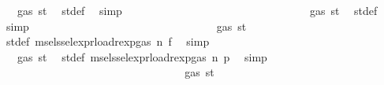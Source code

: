 \begin{isabellebody}
\ {\isachardoublequoteopen}{\isasymdots}\ {\isasymle}\ gas\ st{\isacharprime}{\kern0pt}{\isacharprime}{\kern0pt}{\isacharprime}{\kern0pt}{\isacharprime}{\kern0pt}{\isachardoublequoteclose}\ \isamarkupfalse%
\ st{\isacharprime}{\kern0pt}{\isacharprime}{\kern0pt}{\isacharprime}{\kern0pt}{\isacharprime}{\kern0pt}{\isacharprime}{\kern0pt}{\isacharunderscore}{\kern0pt}def\ \isamarkupfalse%
\ simp\isanewline
\ \ \ \ \ \ \ \ \ \ \ \ \ \ \ \ \ \ \ \ \ \ \ \ \ \ \ \ \isamarkupfalse%
\ \isamarkupfalse%
\ {\isachardoublequoteopen}{\isasymdots}\ {\isasymle}\ gas\ st{\isacharprime}{\kern0pt}{\isacharprime}{\kern0pt}{\isacharprime}{\kern0pt}{\isachardoublequoteclose}\ \isamarkupfalse%
\ st{\isacharprime}{\kern0pt}{\isacharprime}{\kern0pt}{\isacharprime}{\kern0pt}{\isacharprime}{\kern0pt}{\isacharunderscore}{\kern0pt}def\ \isamarkupfalse%
\ simp\isanewline
\ \ \ \ \ \ \ \ \ \ \ \ \ \ \ \ \ \ \ \ \ \ \ \ \ \ \ \ \isamarkupfalse%
\ \isamarkupfalse%
\ {\isachardoublequoteopen}{\isasymdots}\ {\isasymle}\ gas\ st{\isacharprime}{\kern0pt}{\isacharprime}{\kern0pt}{\isachardoublequoteclose}\ \isamarkupfalse%
\ st{\isacharprime}{\kern0pt}{\isacharprime}{\kern0pt}{\isacharprime}{\kern0pt}{\isacharunderscore}{\kern0pt}def\ msel{\isacharunderscore}{\kern0pt}ssel{\isacharunderscore}{\kern0pt}expr{\isacharunderscore}{\kern0pt}load{\isacharunderscore}{\kern0pt}rexp{\isacharunderscore}{\kern0pt}gas{\isacharparenleft}{\kern0pt}{}{\isacharparenright}{\kern0pt}\ n{}\ f{}\ \isamarkupfalse%
\ simp\isanewline
\ \ \ \ \ \ \ \ \ \ \ \ \ \ \ \ \ \ \ \ \ \ \ \ \ \ \ \ \isamarkupfalse%
\ \isamarkupfalse%
\ {\isachardoublequoteopen}{\isasymdots}\ {\isasymle}\ gas\ st{\isacharprime}{\kern0pt}{\isachardoublequoteclose}\ \isamarkupfalse%
\ st{\isacharprime}{\kern0pt}{\isacharprime}{\kern0pt}{\isacharunderscore}{\kern0pt}def\ msel{\isacharunderscore}{\kern0pt}ssel{\isacharunderscore}{\kern0pt}expr{\isacharunderscore}{\kern0pt}load{\isacharunderscore}{\kern0pt}rexp{\isacharunderscore}{\kern0pt}gas{\isacharparenleft}{\kern0pt}{}{\isacharparenright}{\kern0pt}\ n{}\ p{}\ \isamarkupfalse%
\ simp\isanewline
\ \ \ \ \ \ \ \ \ \ \ \ \ \ \ \ \ \ \ \ \ \ \ \ \ \ \ \ \isamarkupfalse%
\ \isamarkupfalse%
\ {\isachardoublequoteopen}{\isasymdots}\ {\isasymle}\ gas\ st{\isachardoublequoteclose}\ \isamarkupfalse%

\end{isabellebody}
